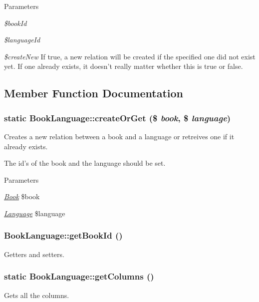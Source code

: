 \begin{DoxyParams}{Parameters}
\item[{\em \$bookId}]\item[{\em \$languageId}]\item[{\em \$createNew}]If true, a new relation will be created if the specified one did not exist yet. If one already exists, it doesn't really matter whether this is true or false. \end{DoxyParams}


\subsection{Member Function Documentation}
\hypertarget{classBookLanguage_a25bff2a665361ac798ebed5ff991e701}{
\subsubsection[{createOrGet}]{\setlength{\rightskip}{0pt plus 5cm}static BookLanguage::createOrGet (\$ {\em book}, \/  \$ {\em language})}}
\label{classBookLanguage_a25bff2a665361ac798ebed5ff991e701}
Creates a new relation between a book and a language or retreives one if it already exists.

The id's of the book and the language should be set.


\begin{DoxyParams}{Parameters}
\item[{\em \hyperlink{classBook}{Book}}]\$book \item[{\em \hyperlink{classLanguage}{Language}}]\$language \end{DoxyParams}
\hypertarget{classBookLanguage_ae0a6dbbcc16626c4eda99ebccc090781}{
\subsubsection[{getBookId}]{\setlength{\rightskip}{0pt plus 5cm}BookLanguage::getBookId ()}}
\label{classBookLanguage_ae0a6dbbcc16626c4eda99ebccc090781}
Getters and setters. \hypertarget{classBookLanguage_afc7dd0ea15ff9f1e04006c4ccc0c8bb6}{
\subsubsection[{getColumns}]{\setlength{\rightskip}{0pt plus 5cm}static BookLanguage::getColumns ()}}
\label{classBookLanguage_afc7dd0ea15ff9f1e04006c4ccc0c8bb6}
Gets all the columns.

